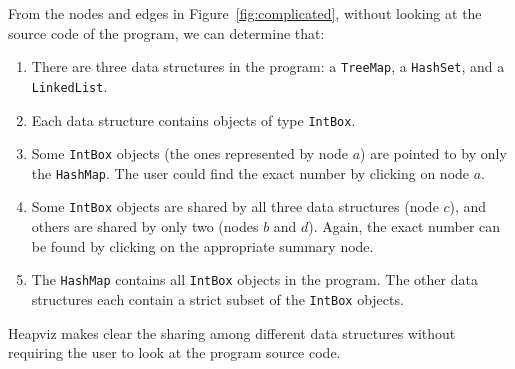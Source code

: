 From the nodes and edges in Figure~\ref{fig:complicated}, without looking 
at the source code of the program, we can determine that:
\begin{enumerate}
\item There are three data structures in the program: a \texttt{TreeMap}, 
a \texttt{HashSet}, and a \texttt{LinkedList}.
\item Each data structure contains objects of type \texttt{IntBox}.
\item Some \texttt{IntBox} objects (the ones represented by node $a$) are 
pointed to by only the \texttt{HashMap}.
The user could find the exact number by clicking on node $a$.
\item Some \texttt{IntBox} objects are shared by all three data structures
(node $c$), and others are shared by only two 
(nodes $b$ and
$d$).  Again, the exact number can be found by clicking on the appropriate 
summary node.
\item The \texttt{HashMap} contains all \texttt{IntBox} objects in the program.
The other data structures each contain a strict subset of the \texttt{IntBox}
objects.
\end{enumerate}

\noindent Heapviz makes clear the sharing among different data structures
without requiring the user to look at the program source code.

